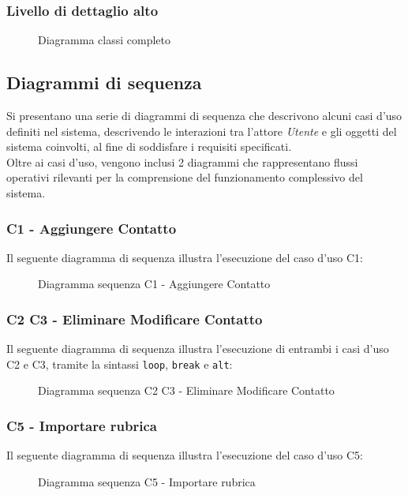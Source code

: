 \subsubsection{Livello di dettaglio alto}

\begin{figure}[h]
	\caption{Diagramma classi completo}
	\label{fig:Diagramma classi completo}
\end{figure}

\newpage
\subsection{Diagrammi di sequenza}
Si presentano una serie di diagrammi di sequenza che descrivono alcuni casi d'uso definiti nel sistema, descrivendo le interazioni tra l'attore \textit{Utente} e gli oggetti del sistema coinvolti, al fine di soddisfare i requisiti specificati. \\
Oltre ai casi d'uso, vengono inclusi 2 diagrammi che rappresentano flussi operativi rilevanti per la comprensione del funzionamento complessivo del sistema.
\subsubsection{C1 - Aggiungere Contatto}
Il seguente diagramma di sequenza illustra l'esecuzione del caso d'uso C1:

\begin{figure}[h]
\caption{Diagramma sequenza C1 - Aggiungere Contatto}
\label{fig:Diagramma sequenza C1 - Aggiungere Contatto}
\end{figure}

\newpage
\subsubsection{C2 C3 - Eliminare Modificare Contatto}
Il seguente diagramma di sequenza illustra l'esecuzione di entrambi i casi d'uso C2 e C3, tramite la sintassi \texttt{loop}, \texttt{break} e \texttt{alt}:

\begin{figure}[h]
\caption{Diagramma sequenza C2 C3 - Eliminare Modificare Contatto}
\label{fig:Diagramma sequenza C2 C3 - Eliminare Modificare Contatto}
\end{figure}

\newpage
\subsubsection{C5 - Importare rubrica}
Il seguente diagramma di sequenza illustra l'esecuzione del caso d'uso C5:

\begin{figure}[h]
	\caption{Diagramma sequenza C5 - Importare rubrica}
	\label{fig:Diagramma sequenza C5 - Importare rubrica}
\end{figure}

